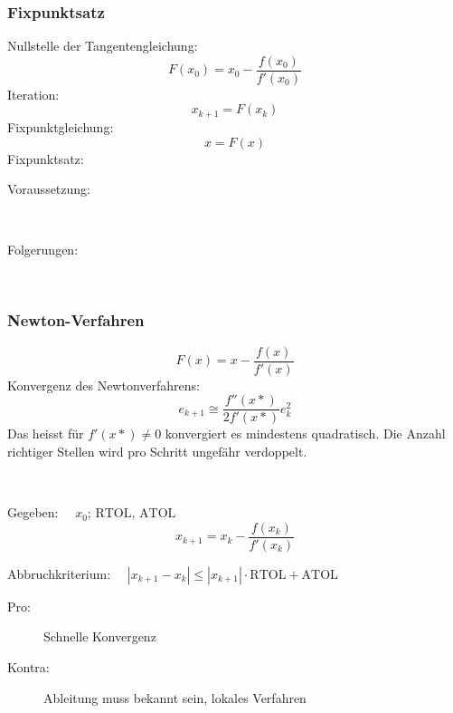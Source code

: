		\subsubsection{Fixpunktsatz}
			Nullstelle der Tangentengleichung:
			\[
				F(x_0) = x_0 - \frac{f(x_0)}{f'(x_0)}
			\]
			Iteration:
			\[
				x_{k+1} = F(x_k)
			\]
			Fixpunktgleichung:
			\[
				x= F(x)
			\]
			Fixpunktsatz: 
			\begin{description}
				\item[Voraussetzung:] ~
				\item[Folgerungen:] ~
			\end{description}

		\subsubsection{Newton-Verfahren}
			\[
				F(x) = x - \frac{f(x)}{f'(x)}
			\]
			Konvergenz des Newtonverfahrens:
			\[
				e_{k+1} \cong \frac{f''(x*)}{2 f'(x*)}e_k^2
			\]
			Das heisst für $f'(x*) \not= 0$ konvergiert es mindestens quadratisch. Die Anzahl richtiger Stellen wird pro Schritt ungefähr verdoppelt.
			
			\begin{algo} ~
				
				Gegeben: $\quad x_0;\, \mathrm{RTOL},\, \mathrm{ATOL}$
				\[
					x_{k+1} = x_k - \frac{f(x_k)}{f'(x_k)}
				\]
				
				Abbruchkriterium: $\quad|x_{k+1} - x_k| \leq |x_{k+1}|\cdot \mathrm{RTOL} + \mathrm{ATOL}$
				\begin{description}
					\item[Pro:] Schnelle Konvergenz
					\item[Kontra:] Ableitung muss bekannt sein, lokales Verfahren
				\end{description}
			\end{algo}

